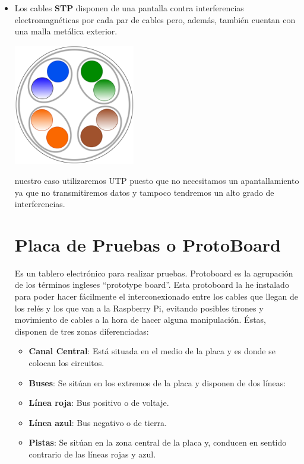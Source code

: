 \begin{itemize}
\item Los cables \textbf{STP} disponen de una pantalla contra interferencias electromagnéticas por cada par de cables pero, además, también cuentan con una malla metálica exterior.
  \begin{center}
  \includegraphics[width=200]{img/STP.pdf}
  \end{center}

\emphEn nuestro caso utilizaremos UTP puesto que no necesitamos un apantallamiento ya que no transmitiremos datos y tampoco tendremos un alto grado de interferencias.

\section{Placa de Pruebas o ProtoBoard}
Es un tablero electrónico para realizar pruebas. Protoboard es la agrupación de los términos ingleses “prototype board”.
Esta protoboard la he instalado para poder hacer fácilmente el interconexionado entre los cables que llegan de los relés y los que van a la Raspberry Pi, evitando posibles tirones y movimiento de cables a la hora de hacer alguna manipulación.
Éstas, disponen de tres zonas diferenciadas:

\begin{itemize}
    \item \textbf{Canal Central}: Está situada en el medio de la placa y es donde se colocan los circuitos.
    \item \textbf{Buses}: Se sitúan en los extremos de la placa y disponen de dos líneas:
    \item \textbf{Línea roja}: Bus positivo o de voltaje.
    \item \textbf{Línea azul}: Bus negativo o de tierra.
    \item \textbf{Pistas}: Se sitúan en la zona central de la placa y, conducen en sentido contrario de las líneas rojas y azul.
\end{itemize}


\end{itemize}
